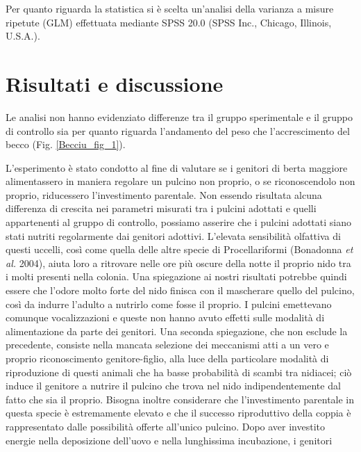 Per quanto riguarda la statistica si \`e scelta
un{\textquoteright}analisi della varianza a misure ripetute (GLM)
effettuata mediante SPSS 20.0 (SPSS Inc., Chicago, Illinois, U.S.A.). 

\section*{Risultati e discussione}

Le analisi non hanno evidenziato differenze tra il gruppo sperimentale e
il gruppo di controllo sia per quanto riguarda
l{\textquoteright}andamento del peso che
l{\textquoteright}accrescimento del becco (Fig. \ref{Becciu_fig_1}).

L{\textquoteright}esperimento \`e stato condotto al fine di valutare se
i genitori di berta maggiore alimentassero in maniera regolare un
pulcino non proprio, o se riconoscendolo non proprio, riducessero
l{\textquoteright}investimento parentale. Non essendo risultata alcuna
differenza di crescita nei parametri misurati tra i pulcini adottati e
quelli appartenenti al gruppo di controllo, possiamo asserire che i
pulcini adottati siano stati nutriti regolarmente dai genitori
adottivi. L{\textquoteright}elevata sensibilit\`a olfattiva di questi
uccelli, cos\`i come quella delle altre specie di Procellariformi
(Bonadonna \textit{et al.} 2004), aiuta loro a ritrovare nelle ore
pi\`u oscure della notte il proprio nido tra i molti presenti nella
colonia. Una spiegazione ai nostri risultati potrebbe quindi essere che
l{\textquoteright}odore molto forte del nido finisca con il mascherare
quello del pulcino, cos\`i da indurre l{\textquoteright}adulto a
nutrirlo come fosse il proprio. I pulcini emettevano comunque
vocalizzazioni e queste non hanno avuto effetti sulle modalit\`a di
alimentazione da parte dei genitori. Una seconda spiegazione, che non
esclude la precedente, consiste nella mancata selezione dei meccanismi
atti a un vero e proprio riconoscimento genitore-figlio, alla luce
della particolare modalit\`a di riproduzione di questi animali che ha
basse probabilit\`a di scambi tra nidiacei; ci\`o induce il genitore a
nutrire il pulcino che trova nel nido indipendentemente dal fatto che
sia il proprio. Bisogna inoltre considerare che
l{\textquoteright}investimento parentale in questa specie \`e
estremamente elevato e che il successo riproduttivo della coppia \`e
rappresentato dalle possibilit\`a offerte all{\textquoteright}unico
pulcino. Dopo aver investito energie nella deposizione
dell{\textquoteright}uovo e nella lunghissima incubazione, i genitori
